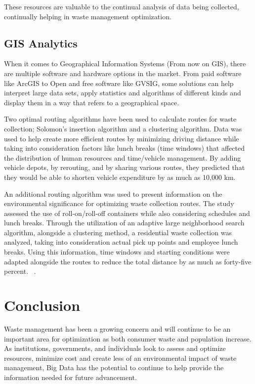\documentclass[sigconf]{acmart}
\begin{document}
These resources are valuable to the continual analysis of data being collected, continually helping in waste management optimization.

\subsection{GIS Analytics}

When it comes to Geographical Information Systems (From now on GIS), there are multiple software and hardware options in the market. From paid software like ArcGIS to Open and free software like GVSIG, some solutions can help interpret large data sets, apply statistics and algorithms of different kinds and display them in a way that refers to a geographical space. %

Two optimal routing algorithms have been used to calculate routes for waste collection; Solomon's insertion algorithm and a clustering algorithm.  Data was used to help create more efficient routes by minimizing driving distance while taking into consideration factors like lunch breaks (time windows) that affected the distribution of human resources and time/vehicle management.  By adding vehicle depots, by rerouting, and by sharing various routes, they predicted that they would be able to shorten vehicle expenditure by as much as 10,000 km.  

An additional routing algorithm was used to present information on the environmental significance for optimizing waste collection routes.  The study assessed the use of roll-on/roll-off containers while also considering schedules and lunch breaks.  Through the utilization of an adaptive large neighborhood search algorithm, alongside a clustering method, a residential waste collection was analyzed, taking into consideration actual pick up points and employee lunch breaks.  Using this information, time windows and starting conditions were adapted alongside the routes to reduce the total distance by as much as forty-five percent. ~\cite{shahrokni2014big}.

\section{Conclusion}
Waste management has been a growing concern and will continue to be an important area for optimization as both consumer waste and population increase.  As institutions, governments, and individuals look to assess and optimize resources, minimize cost and create less of an environmental impact of waste management, Big Data has the potential to continue to help provide the information needed for future advancement.
\end{document}
